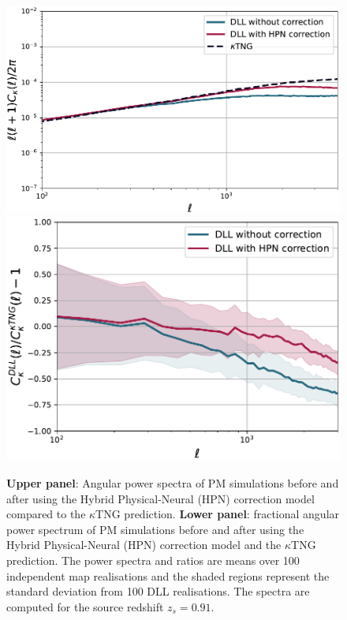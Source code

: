 \documentclass[twocolumn,twocolappendix]{aastex63}
\begin{document}
\begin{figure}
    \centering
    \includegraphics[width=\columnwidth]{paper/figures/cls_DLL_vs_ktng_hpn.pdf}
        \includegraphics[width=\columnwidth]{paper/figures/res_cls_DLL_vs_ktng_hpn.pdf}
    \caption{
    \textbf{Upper panel}: Angular power spectra of PM simulations before and after using the Hybrid Physical-Neural (HPN) correction model compared to the $\kappa$TNG prediction. \textbf{Lower panel}: fractional angular power spectrum of PM simulations before and after using the Hybrid Physical-Neural (HPN) correction model and the $\kappa$TNG prediction. The power spectra and ratios are means over 100 independent map realisations and the shaded regions represent the standard deviation from 100 DLL realisations. The spectra are computed for the source redshift $z_s=0.91$. 
}
    \label{fig:ps_comp}
\end{figure}
\end{document}
